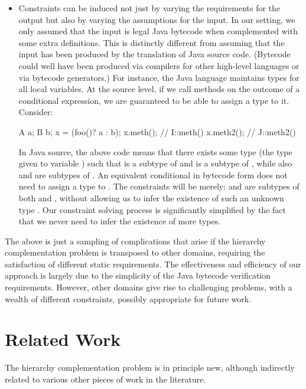 \begin{itemize}[--]
\item Constraints can be induced not just by varying the requirements
  for the output but also by varying the assumptions for the input.
  In our setting, we only assumed that the input is legal Java
  bytecode when complemented with some extra definitions. This is
  distinctly different from assuming that the input has been produced
  by the translation of Java source code. (Bytecode could well have
  been produced via compilers for other high-level languages or via
  bytecode generators.) For instance, the Java language maintains
  types for all local variables. At the source level, if we call
  methods on the outcome of a conditional expression, we are
  guaranteed to be able to assign a type to it. Consider:

  \begin{javacode}
    A a;
    B b;
    x = (foo()? a : b);
    x.meth();  // I::meth()
    x.meth2(); // J::meth2()
  \end{javacode}

  In Java source, the above code means that there exists some type
   (the type given to variable ) such that  is
  a subtype of  and  is a subtype of , while
  also  and  are subtypes of . An equivalent
  conditional in bytecode form does not need to assign a type to
  . The constraints will be merely:  and  are
  subtypes of both  and , without allowing us to infer
  the existence of such an unknown type . Our constraint
  solving process is significantly simplified by the fact that we
  never need to infer the existence of more types.

\end{itemize}

The above is just a sampling of complications that arise if the
hierarchy complementation problem is transposed to other domains,
requiring the satisfaction of different static requirements. The
effectiveness and efficiency of our approach is largely due to
the simplicity of the Java bytecode verification requirements.
However, other domains give rise to challenging problems,
with a wealth of different constraints, possibly appropriate for
future work.



\section{Related Work}
The hierarchy complementation problem is in principle new, although
indirectly related to various other pieces of work in the literature.

